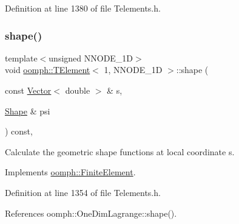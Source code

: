 Definition at line 1380 of file Telements.\+h.

\mbox{\label{classoomph_1_1TElement_3_011_00_01NNODE__1D_01_4_ab9ba6ae1a07589f1b41adc06f2e17884}} 
\subsubsection{\texorpdfstring{shape()}{shape()}}
{\footnotesize\ttfamily template$<$unsigned N\+N\+O\+D\+E\+\_\+1D$>$ \\
void \hyperlink{classoomph_1_1TElement}{oomph\+::\+T\+Element}$<$ 1, N\+N\+O\+D\+E\+\_\+1D $>$\+::shape (\begin{DoxyParamCaption}\item[{const \hyperlink{classoomph_1_1Vector}{Vector}$<$ double $>$ \&}]{s,  }\item[{\hyperlink{classoomph_1_1Shape}{Shape} \&}]{psi }\end{DoxyParamCaption}) const\hspace{0.3cm}{\ttfamily [inline]}, {\ttfamily [virtual]}}



Calculate the geometric shape functions at local coordinate s. 



Implements \hyperlink{classoomph_1_1FiniteElement_a58a25b6859ddd43b7bfe64a19fee5023}{oomph\+::\+Finite\+Element}.



Definition at line 1354 of file Telements.\+h.



References oomph\+::\+One\+Dim\+Lagrange\+::shape().

\mbox{\label{classoomph_1_1TElement_3_011_00_01NNODE__1D_01_4_a22009472036b36ba8291fe72bd5da457}} 
